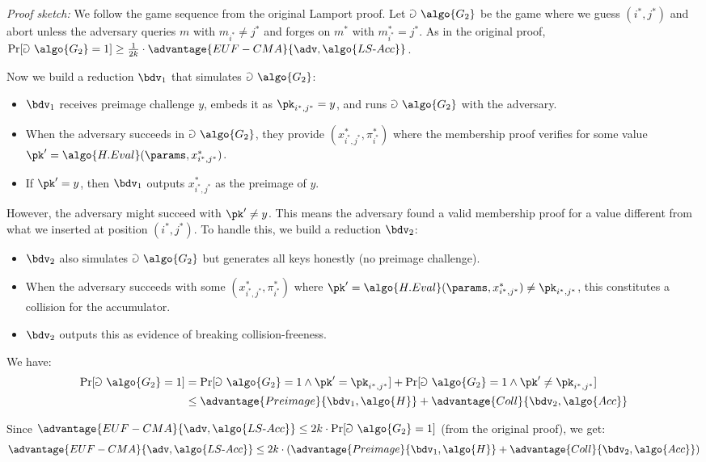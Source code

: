 \begin{mysolution}
\begin{enumerate}
    \emph{Proof sketch:}
    We follow the game sequence from the original Lamport proof.
    Let $\Game~\algo{G_2}$ be the game where we guess $(i^*, j^*)$ and abort unless the adversary queries $m$ with $m_{i^*} \neq j^*$ and forges on $m^*$ with $m^*_{i^*} = j^*$.
    As in the original proof, $\Pr[\Game~\algo{G_2} = 1] \geq \frac{1}{2k} \cdot \advantage{EUF-CMA}{\adv, \algo{LS\text{-}Acc}}$.
    
    Now we build a \ppt reduction $\bdv_1$ that simulates $\Game~\algo{G_2}$:
    \begin{itemize}
      \item $\bdv_1$ receives preimage challenge $y$, embeds it as $\pk_{i^*,j^*} = y$, and runs $\Game~\algo{G_2}$ with the adversary.
      \item When the adversary succeeds in $\Game~\algo{G_2}$, they provide $(x^*_{i^*,j^*}, \pi^*_{i^*})$ where the membership proof verifies for some value $\pk' = \algo{H.Eval}(\params, x^*_{i^*,j^*})$.
      \item If $\pk' = y$, then $\bdv_1$ outputs $x^*_{i^*,j^*}$ as the preimage of $y$.
    \end{itemize}
    
    However, the adversary might succeed with $\pk' \neq y$.
    This means the adversary found a valid membership proof for a value different from what we inserted at position $(i^*, j^*)$.
    To handle this, we build a \ppt reduction $\bdv_2$:
    \begin{itemize}
      \item $\bdv_2$ also simulates $\Game~\algo{G_2}$ but generates all keys honestly (no preimage challenge).
      \item When the adversary succeeds with some $(x^*_{i^*,j^*}, \pi^*_{i^*})$ where $\pk' = \algo{H.Eval}(\params, x^*_{i^*,j^*}) \neq \pk_{i^*,j^*}$, this constitutes a collision for the accumulator.
      \item $\bdv_2$ outputs this as evidence of breaking collision-freeness.
    \end{itemize}
    
    We have:
    \begin{align*}
      \Pr[\Game~\algo{G_2} = 1] &= \Pr[\Game~\algo{G_2} = 1 \wedge \pk' = \pk_{i^*,j^*}] + \Pr[\Game~\algo{G_2} = 1 \wedge \pk' \neq \pk_{i^*,j^*}]\\
      &\leq \advantage{Preimage}{\bdv_1, \algo{H}} + \advantage{Coll}{\bdv_2, \algo{Acc}}
    \end{align*}
    
    Since $\advantage{EUF-CMA}{\adv, \algo{LS\text{-}Acc}} \leq 2k \cdot \Pr[\Game~\algo{G_2} = 1]$ (from the original proof), we get:
    \[
      \advantage{EUF-CMA}{\adv, \algo{LS\text{-}Acc}} \leq 2k \cdot (\advantage{Preimage}{\bdv_1, \algo{H}} + \advantage{Coll}{\bdv_2, \algo{Acc}})
    \]
  \end{enumerate}
\end{mysolution}
\fi

